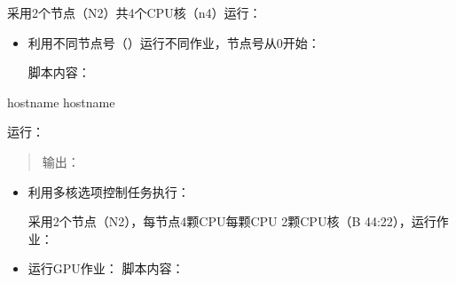 \documentclass[a4paper,12pt,english]{sphinxmanual}
\begin{document}
\sphinxAtStartPar
采用2个节点（\sphinxhyphen{}N2）共4个CPU核（\sphinxhyphen{}n4）运行：
\begin{itemize}
\item {} 
\sphinxAtStartPar
利用不同节点号（）运行不同作业，节点号从0开始：

\sphinxAtStartPar
脚本内容：

\end{itemize}

\begin{sphinxVerbatim}[commandchars=\\\{\}]
  
         
        hostname
        hostname
         
\end{sphinxVerbatim}

\sphinxAtStartPar
运行： 
\begin{quote}

\sphinxAtStartPar
输出：
\end{quote}

\begin{sphinxVerbatim}[commandchars=\\\{\}]
          
\end{sphinxVerbatim}
\begin{itemize}
\item {} 
\sphinxAtStartPar
利用多核选项控制任务执行：

\sphinxAtStartPar
采用2个节点（\sphinxhyphen{}N2），每节点4颗CPU每颗CPU 2颗CPU核（\sphinxhyphen{}B 4\sphinxhyphen{}4:2\sphinxhyphen{}2），运行作业：

\sphinxAtStartPar
{}

\item {} 
\sphinxAtStartPar
运行GPU作业： 脚本内容：

\end{itemize}
\end{document}

